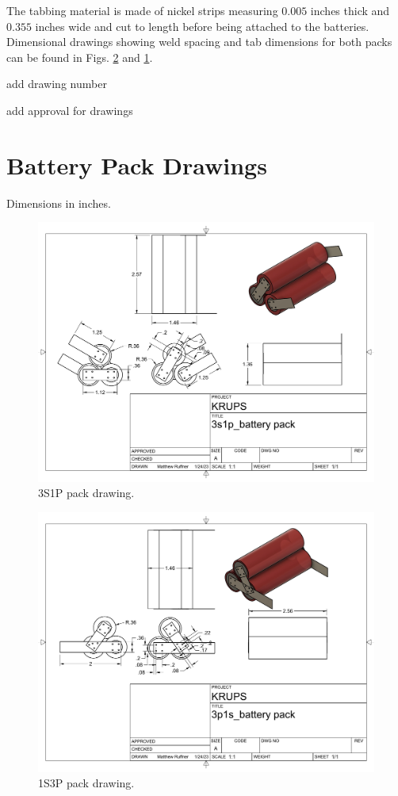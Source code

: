 \documentclass{article}
\begin{document}
The tabbing material is made of nickel strips measuring $0.005$ inches thick and $0.355$ inches wide and cut to length before being attached to the batteries. Dimensional drawings showing weld spacing and tab dimensions for both packs can be found in Figs. \ref{fig:1s3p_drawing} and \ref{fig:3s1p_drawing}.

\appendix

add drawing number

add approval for drawings

\section{Battery Pack Drawings}
Dimensions in inches.
\begin{figure}
\centering
\includegraphics[width=\textwidth]{images/3s1p_battery pack Drawing v2.pdf}
\caption{3S1P pack drawing.}
\label{fig:3s1p_drawing}
\end{figure}

\begin{figure}
\centering
\includegraphics[width=\textwidth]{images/3p1s_battery pack Drawing v0.pdf}
\caption{1S3P pack drawing.}
\label{fig:1s3p_drawing}
\end{figure}
\end{document}
